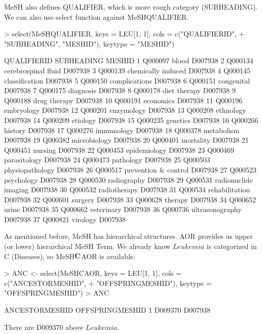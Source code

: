 \documentclass[11pt]{article}
\begin{document}
MeSH also defines QUALIFIER, which is more rough category (SUBHEADING). We can also use select function against MeSHQUALIFIER.
\begin{center}
\begin{Schunk}
\begin{Sinput}
> select(MeSHQUALIFIER, keys = LEU[1, 1], cols = c("QUALIFIERID", 
+     "SUBHEADING", "MESHID"), keytype = "MESHID")
\end{Sinput}
\begin{Soutput}
   QUALIFIERID           SUBHEADING  MESHID
1      Q000097                blood D007938
2      Q000134  cerebrospinal fluid D007938
3      Q000139   chemically induced D007938
4      Q000145       classification D007938
5      Q000150        complications D007938
6      Q000151           congenital D007938
7      Q000175            diagnosis D007938
8      Q000178         diet therapy D007938
9      Q000188         drug therapy D007938
10     Q000191            economics D007938
11     Q000196           embryology D007938
12     Q000201           enzymology D007938
13     Q000208            ethnology D007938
14     Q000209             etiology D007938
15     Q000235             genetics D007938
16     Q000266              history D007938
17     Q000276           immunology D007938
18     Q000378           metabolism D007938
19     Q000382         microbiology D007938
20     Q000401            mortality D007938
21     Q000451              nursing D007938
22     Q000453         epidemiology D007938
23     Q000469         parasitology D007938
24     Q000473            pathology D007938
25     Q000503      physiopathology D007938
26     Q000517 prevention & control D007938
27     Q000523           psychology D007938
28     Q000530          radiography D007938
29     Q000531 radionuclide imaging D007938
30     Q000532         radiotherapy D007938
31     Q000534       rehabilitation D007938
32     Q000601              surgery D007938
33     Q000628              therapy D007938
34     Q000652                urine D007938
35     Q000662           veterinary D007938
36     Q000736      ultrasonography D007938
37     Q000821             virology D007938
\end{Soutput}
\end{Schunk}
\end{center}

As mentioned before, MeSH has hierarchical structures. AOR provides us upper (or lower) hierarchical MeSH Term. We already know $Leukemia$ is categorized in C (Diseases), so MeSH$\bf{C}$AOR is available.
\begin{center}
\begin{Schunk}
\begin{Sinput}
> ANC <- select(MeSHCAOR, keys = LEU[1, 1], cols = c("ANCESTORMESHID", 
+     "OFFSPRINGMESHID"), keytype = "OFFSPRINGMESHID")
> ANC
\end{Sinput}
\begin{Soutput}
  ANCESTORMESHID OFFSPRINGMESHID
1        D009370         D007938
\end{Soutput}
\end{Schunk}
\end{center}
There are D009370 above $Leukemia$.\\
\end{document}

